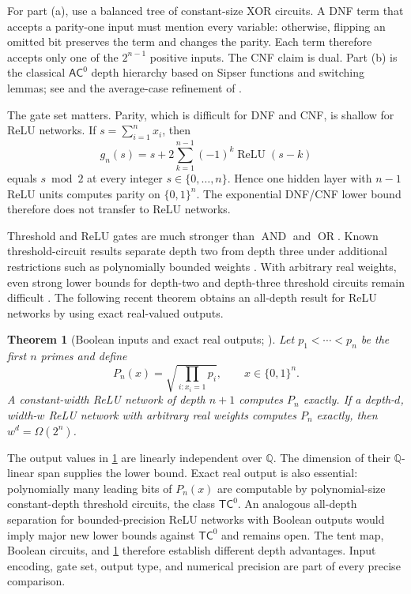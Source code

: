 \documentclass[11pt,twoside]{article}
\newcommand{\relu}{\operatorname{ReLU}}
\newcommand{\AND}{\operatorname{AND}}
\newcommand{\OR}{\operatorname{OR}}
\newtheorem{theorem}{Theorem}[section]
\theoremstyle{definition}
\theoremstyle{remark}
\begin{document}
For part (a), use a balanced tree of constant-size XOR circuits. A DNF term
that accepts a parity-one input must mention every variable: otherwise,
flipping an omitted bit preserves the term and changes the parity. Each term
therefore accepts only one of the $2^{n-1}$ positive inputs. The CNF claim is
dual. Part (b) is the classical $\mathsf{AC}^0$ depth hierarchy based on
Sipser functions and switching lemmas; see \citet{hastad1986} and the
average-case refinement of \citet{hastad2017}.

The gate set matters. Parity, which is difficult for DNF and CNF, is shallow
for ReLU networks. If $s=\sum_{i=1}^n x_i$, then
\begin{equation}
 g_n(s)=s+2\sum_{k=1}^{n-1}(-1)^k\relu(s-k)
 \label{eq:relu-parity}
\end{equation}
equals $s\bmod2$ at every integer $s\in\{0,\ldots,n\}$. Hence one hidden
layer with $n-1$ ReLU units computes parity on $\{0,1\}^n$. The exponential
DNF/CNF lower bound therefore does not transfer to ReLU networks.

Threshold and ReLU gates are much stronger than $\AND$ and $\OR$. Known
threshold-circuit results separate depth two from depth three under
additional restrictions such as polynomially bounded weights
\citep{hajnal1993}. With arbitrary real weights, even strong lower bounds for
depth-two and depth-three threshold circuits remain difficult
\citep{kane2016}. The following recent theorem obtains an all-depth result
for ReLU networks by using exact real-valued outputs.

\begin{theorem}[Boolean inputs and exact real outputs; \citealp{krishnan2026}]
\label{thm:binary-relu-depth}
Let $p_1<\cdots<p_n$ be the first $n$ primes and define
\[
 P_n(x)=\sqrt{\prod_{i:x_i=1}p_i},
 \qquad x\in\{0,1\}^n.
\]
A constant-width ReLU network of depth $n+1$ computes $P_n$ exactly. If a
depth-$d$, width-$w$ ReLU network with arbitrary real weights computes
$P_n$ exactly, then $w^d=\Omega(2^n)$.
\end{theorem}

The output values in \cref{thm:binary-relu-depth} are linearly independent
over $\mathbb Q$. The dimension of their $\mathbb Q$-linear span supplies the
lower bound. Exact real output is also essential: polynomially many leading
bits of $P_n(x)$ are computable by polynomial-size constant-depth threshold
circuits, the class $\mathsf{TC}^0$. An analogous all-depth separation for
bounded-precision ReLU networks with Boolean outputs would imply major new
lower bounds against $\mathsf{TC}^0$ and remains open. The tent map,
Boolean circuits, and \cref{thm:binary-relu-depth} therefore establish
different depth advantages. Input encoding, gate set, output type, and
numerical precision are part of every precise comparison.
\end{document}
